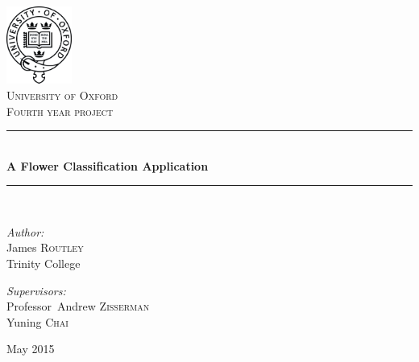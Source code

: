 \documentclass[11pt, a4paper]{report}
\newcommand{\HRule}{\rule{\linewidth}{0.5mm}}
\begin{document}
\begin{titlepage}
\begin{center}


\includegraphics[width=0.16\textwidth]{img/OxfLogo.png}~\\[1.5cm]

\textsc{\LARGE University of Oxford}\\[1.5cm]
\textsc{\Large Fourth year project}\\[0.5cm]

\HRule \\[0.4cm]
{ \huge \bfseries A Flower Classification Application \\[0.4cm] }

\HRule \\[1.5cm]

\noindent
\begin{minipage}[t]{0.4\textwidth}
\begin{flushleft} \large
\emph{Author:}\\
James \textsc{Routley} \\
Trinity College
\end{flushleft}
\end{minipage}%
\begin{minipage}[t]{0.4\textwidth}
\begin{flushright} \large
\emph{Supervisors:} \\
Professor~Andrew \textsc{Zisserman} \\
Yuning \textsc{Chai}
\end{flushright}
\end{minipage}

\vfill

{\large May 2015}

\end{center}
\end{titlepage}
\end{document}
